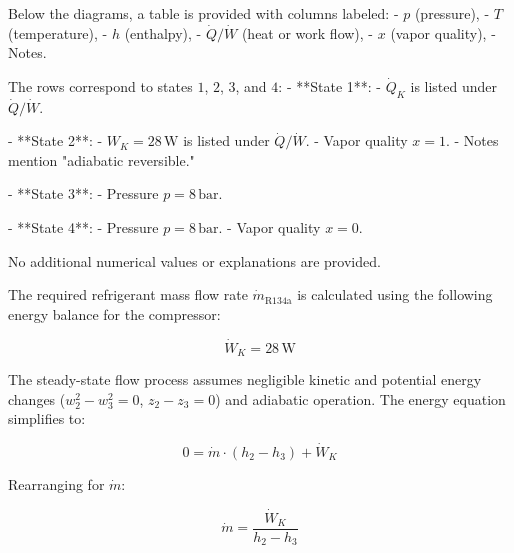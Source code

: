Below the diagrams, a table is provided with columns labeled:  
- \(p\) (pressure),  
- \(T\) (temperature),  
- \(h\) (enthalpy),  
- \(\dot{Q}/\dot{W}\) (heat or work flow),  
- \(x\) (vapor quality),  
- Notes.  

The rows correspond to states \(1\), \(2\), \(3\), and \(4\):  
- **State 1**:  
  - \(\dot{Q}_K\) is listed under \(\dot{Q}/\dot{W}\).  

- **State 2**:  
  - \(W_K = 28 \, \text{W}\) is listed under \(\dot{Q}/\dot{W}\).  
  - Vapor quality \(x = 1\).  
  - Notes mention "adiabatic reversible."  

- **State 3**:  
  - Pressure \(p = 8 \, \text{bar}\).  

- **State 4**:  
  - Pressure \(p = 8 \, \text{bar}\).  
  - Vapor quality \(x = 0\).  

No additional numerical values or explanations are provided.

The required refrigerant mass flow rate \( \dot{m}_{\text{R134a}} \) is calculated using the following energy balance for the compressor:  

\[
\dot{W}_K = 28 \, \text{W}
\]

The steady-state flow process assumes negligible kinetic and potential energy changes (\( w_2^2 - w_3^2 = 0 \), \( z_2 - z_3 = 0 \)) and adiabatic operation. The energy equation simplifies to:  

\[
0 = \dot{m} \cdot (h_2 - h_3) + \dot{W}_K
\]

Rearranging for \( \dot{m} \):  

\[
\dot{m} = \frac{\dot{W}_K}{h_2 - h_3}
\]